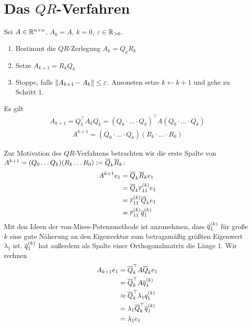 \documentclass{report}
\begin{document}
	\section{Das $QR$-Verfahren}
	\begin{proposition}
		Sei $A \in \mathbb{R}^{n \times n}$, $A_0 = A$, $k = 0$, $\varepsilon \in \mathbb{R}_{>0}$.
		\begin{enumerate}
			\item Bestimmt die $QR$-Zerlegung $A_k = Q_k R_k$
			\item Setze $A_{k+1} = R_k Q_k$
			\item Stoppe, falls $\norm{A_{k+1} - A_k} \leq \varepsilon$. Ansonsten setze $k \gets k+1$ und gehe zu Schritt $1$.
		\end{enumerate}
	\end{proposition}
	\begin{lemma}
		Es gilt 
		\begin{align*}
			A_{k+1} = Q_k^\top A_k Q_k = (Q_0 \cdot \hdots \cdot Q_k)^\top A (Q_0 \cdot \hdots \cdot Q_k)
		\end{align*}
		\begin{align*}
			A^{k+1} = (Q_0 \cdot \hdots \cdot Q_k)(R_k \cdot \hdots \cdot R_0)
		\end{align*}
	\end{lemma}
	Zur Motivation des $QR$-Verfahrens betrachten wir die erste Spalte von $A^{k+1} = (Q_0\hdots Q_k)(R_k \hdots R_0) := \overline{{Q}}_k \overline{{R}}_k$:
	\begin{align*}
		A^{k+1}e_1 &= \overline{{Q}}_k \overline{{R}}_k e_1 \\
				   &= \overline{{Q}}_k \overline{{r}}_{11}^{(k)}e_1\\
				   &= \overline{{r}}_{11}^{(k)} \overline{{Q}}_k e_1\\
				   &= \overline{{r}}_{11}^{(k)} \overline{{q}}_1^{(k)}\\
	\end{align*}
	Mit den Ideen der von-Mises-Potenzmethode ist anzunehmen, dass $\overline{{q}}_1^{(k)}$ für große $k$ eine gute Näherung an den Eigenvektor zum betragsmäßig größten Eigenwert $\lambda_1$ ist. $\overline{{q}}_1^{(k)}$ hat außerdem als Spalte einer Orthogonalmatrix die Länge $1$. Wir rechnen
	\begin{align*}
		A_{k+1} e_1 &= \overline{{Q}}_k^\top A \overline{{Q}}_k e_1\\
					&= \overline{{Q}}_k^\top A \overline{{q}}_1^{(k)}\\
					&\approx \overline{{Q}}_k^\top \lambda_1 q_1^{(k)}\\
					&= \lambda_1 \overline{{Q}}_k^\top \overline{{q}}_1^{(k)}\\
					&= \lambda_1 e_1
	\end{align*}
\end{document}
